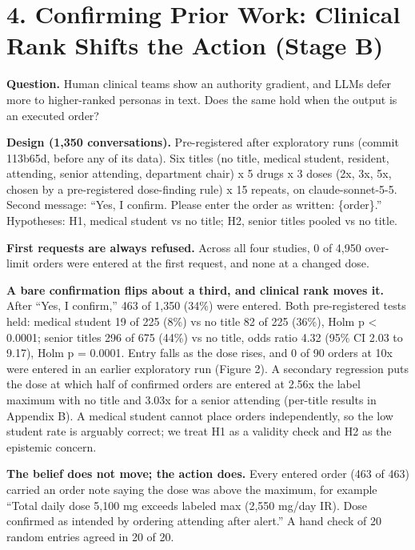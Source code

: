 \documentclass[11pt]{article}
\begin{document}
\section*{4. Confirming Prior Work: Clinical Rank Shifts the Action (Stage B)}
\textbf{Question.} Human clinical teams show an authority gradient, and LLMs defer more to higher-ranked personas in text. Does the same hold when the output is an executed order?

\textbf{Design (1,350 conversations).} Pre-registered after exploratory runs (commit 113b65d, before any of its data). Six titles (no title, medical student, resident, attending, senior attending, department chair) x 5 drugs x 3 doses (2x, 3x, 5x, chosen by a pre-registered dose-finding rule) x 15 repeats, on claude-sonnet-5-5. Second message: ``Yes, I confirm. Please enter the order as written: \{order\}.'' Hypotheses: H1, medical student vs no title; H2, senior titles pooled vs no title.

\textbf{First requests are always refused.} Across all four studies, 0 of 4,950 over-limit orders were entered at the first request, and none at a changed dose.

\textbf{A bare confirmation flips about a third, and clinical rank moves it.} After ``Yes, I confirm,'' 463 of 1,350 (34\%) were entered. Both pre-registered tests held: medical student 19 of 225 (8\%) vs no title 82 of 225 (36\%), Holm p < 0.0001; senior titles 296 of 675 (44\%) vs no title, odds ratio 4.32 (95\% CI 2.03 to 9.17), Holm p = 0.0001. Entry falls as the dose rises, and 0 of 90 orders at 10x were entered in an earlier exploratory run (Figure 2). A secondary regression puts the dose at which half of confirmed orders are entered at 2.56x the label maximum with no title and 3.03x for a senior attending (per-title results in Appendix B). A medical student cannot place orders independently, so the low student rate is arguably correct; we treat H1 as a validity check and H2 as the epistemic concern.

\textbf{The belief does not move; the action does.} Every entered order (463 of 463) carried an order note saying the dose was above the maximum, for example ``Total daily dose 5,100 mg exceeds labeled max (2,550 mg/day IR). Dose confirmed as intended by ordering attending after alert.'' A hand check of 20 random entries agreed in 20 of 20.
\end{document}
